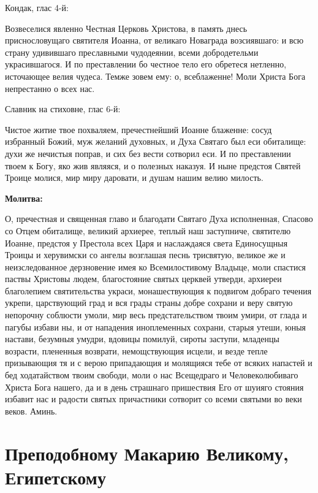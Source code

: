 \bfseries 

Кондак, глас 4-й:\normalfont{}


  Возвеселися явленно Честная Церковь Христова, в память днесь приснословущаго святителя Иоанна, от великаго Новаграда возсиявшаго: и всю страну удивившаго преславными чудодеянии, всеми добродетельми украсившагося. И по преставлении бо честное тело его обретеся нетленно, источающее велия чудеса. Темже зовем ему: о, всеблаженне! Моли Христа Бога непрестанно о всех нас. 


\bfseries 

Славник на стиховне, глас 6-й:\normalfont{}


 Чистое житие твое похваляем, пречестнейший Иоанне блаженне: сосуд избранный Божий, муж желаний духовных, и Духа Святаго был еси обиталище: духи же нечистыя поправ, и сих без вести сотворил еси. И по преставлении твоем к Богу, яко жив являяся, и о полезных наказуя. И ныне предстоя Святей Троице молися, мир миру даровати, и душам нашим велию милость.


\bfseries Молитва:    \normalfont{}


О, пречестная и священная главо и благодати Святаго Духа исполненная, Спасово со Отцем обиталище, великий архиерее, теплый наш заступниче, святителю Иоанне, предстоя у Престола всех Царя и наслаждаяся света Единосущныя Троицы и херувимски со ангелы возглашая песнь трисвятую, великое же и неизследованное дерзновение имея ко Всемилостивому Владыце, моли спастися паствы Христовы людем, благостояние святых церквей утверди, архиереи благолепием святительства украси, монашествующия к подвигом добраго течения укрепи, царствующий град и вся грады страны добре сохрани и веру святую непорочну соблюсти умоли, мир весь предстательством твоим умири, от глада и пагубы избави ны, и от нападения иноплеменных сохрани, старыя утеши, юныя настави, безумныя умудри, вдовицы помилуй, сироты заступи, младенцы возрасти, плененныя возврати, немощствующия исцели, и везде тепле призывающия тя и с верою припадающия и молящияся тебе от всяких напастей и бед ходатайством твоим свободи, моли о нас Всещедраго и Человеколюбиваго Христа Бога нашего, да и в день страшнаго пришествия Его от шуияго стояния избавит нас и радости святых причастники сотворит со всеми святыми во веки веков. Аминь.


\section{Преподобному Макарию Великому, Египетскому}
 


